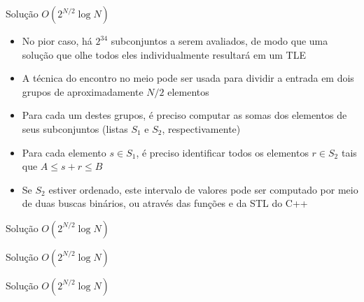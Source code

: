 \begin{frame}[fragile]{Solução $O(2^{N/2}\log N)$}

    \begin{itemize}
        \item No pior caso, há $2^{34}$ subconjuntos a serem avaliados, de modo que uma solução
            que olhe todos eles individualmente resultará em um TLE

        \item A técnica do encontro no meio pode ser usada para dividir a entrada em dois
            grupos de aproximadamente $N/2$ elementos

        \item Para cada um destes grupos, é preciso computar as somas dos elementos de seus
            subconjuntos (listas $S_1$ e $S_2$, respectivamente)

        \item Para cada elemento $s\in S_1$, é preciso identificar todos os elementos $r\in S_2$
            tais que $A\leq s + r\leq B$

        \item Se $S_2$ estiver ordenado, este intervalo de valores pode ser computado por meio
            de duas buscas binários, ou através das funções  e
             da STL do C++

    \end{itemize}

\end{frame}

\begin{frame}[fragile]{Solução $O(2^{N/2}\log N)$}
\end{frame}

\begin{frame}[fragile]{Solução $O(2^{N/2}\log N)$}
\end{frame}

\begin{frame}[fragile]{Solução $O(2^{N/2}\log N)$}
\end{frame}


